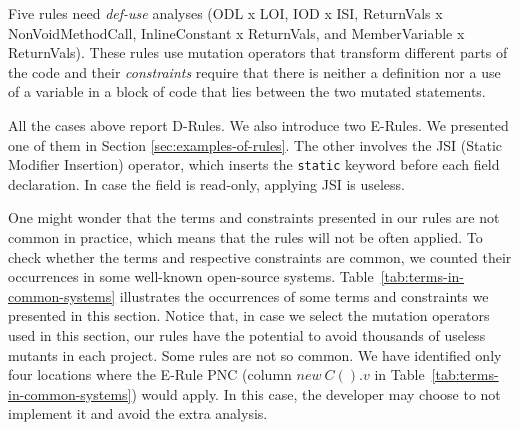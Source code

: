 Five rules need \textit{def-use} analyses (ODL x LOI, IOD x ISI, ReturnVals x NonVoidMethodCall, InlineConstant x ReturnVals, and MemberVariable x ReturnVals). 
These rules use mutation operators that transform different parts of the code and their \textit{constraints} require that there is neither a definition nor a use of a variable in a block of code that lies between the two mutated statements.

All the cases above report D-Rules. We also introduce two E-Rules. We presented one of them in Section \ref{sec:examples-of-rules}. The other involves the JSI (Static Modifier Insertion) operator, which inserts the \texttt{static} keyword before each field declaration. In case the field is read-only, applying JSI is useless.

One might wonder that the terms and constraints presented in our rules are not common in practice, which means that the rules will not be often applied. To check whether the terms and respective constraints are common, we coun\-ted their occurrences in some well-known open-source systems. Table~\ref{tab:terms-in-common-systems} illustrates the occurrences of some terms and constraints we presented in this section. 
Notice that, in case we select the mutation operators used in this section, our rules have the potential to avoid thousands of useless mutants in each project.
Some rules are not so common. 
We have identified only four locations where the E-Rule PNC (column $new~C().v$ in Table~\ref{tab:terms-in-common-systems}) would apply.
In this case, the developer may choose to not implement it and avoid the extra analysis.

